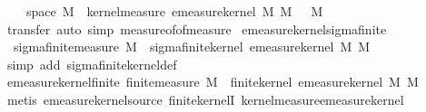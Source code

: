 \begin{isabellebody}
\ \ {\isachardoublequoteopen}{\isasymomega}\ {\isasymin}\ space\ M\ {\isasymLongrightarrow}\ kernel{\isacharunderscore}{\kern0pt}measure\ {\isacharparenleft}{\kern0pt}emeasure{\isacharunderscore}{\kern0pt}kernel\ M\ M{\isacharprime}{\kern0pt}{\isacharparenright}{\kern0pt}\ {\isasymomega}\ {\isacharequal}{\kern0pt}\ M{\isacharprime}{\kern0pt}{\isachardoublequoteclose}\isanewline
%
\isadelimproof
\ \ %
\endisadelimproof
%
\isatagproof
{}\isamarkupfalse%
\ {\isacharparenleft}{\kern0pt}transfer{\isacharcomma}{\kern0pt}\ auto\ simp{\isacharcolon}{\kern0pt}\ measure{\isacharunderscore}{\kern0pt}of{\isacharunderscore}{\kern0pt}of{\isacharunderscore}{\kern0pt}measure{\isacharparenright}{\kern0pt}%
\endisatagproof
{\isafoldproof}%
%
\isadelimproof
\isanewline
%
\endisadelimproof
\isanewline
{}\isamarkupfalse%
\ emeasure{\isacharunderscore}{\kern0pt}kernel{\isacharunderscore}{\kern0pt}sigma{\isacharunderscore}{\kern0pt}finite{\isacharcolon}{\kern0pt}\isanewline
\ \ {\isachardoublequoteopen}sigma{\isacharunderscore}{\kern0pt}finite{\isacharunderscore}{\kern0pt}measure\ M{\isacharprime}{\kern0pt}\ {\isasymLongrightarrow}\ sigma{\isacharunderscore}{\kern0pt}finite{\isacharunderscore}{\kern0pt}kernel\ {\isacharparenleft}{\kern0pt}emeasure{\isacharunderscore}{\kern0pt}kernel\ M\ M{\isacharprime}{\kern0pt}{\isacharparenright}{\kern0pt}{\isachardoublequoteclose}\isanewline
%
\isadelimproof
\ \ %
\endisadelimproof
%
\isatagproof
{}\isamarkupfalse%
\ {\isacharparenleft}{\kern0pt}simp\ add{\isacharcolon}{\kern0pt}\ sigma{\isacharunderscore}{\kern0pt}finite{\isacharunderscore}{\kern0pt}kernel{\isacharunderscore}{\kern0pt}def{\isacharparenright}{\kern0pt}%
\endisatagproof
{\isafoldproof}%
%
\isadelimproof
\isanewline
%
\endisadelimproof
\isanewline
{}\isamarkupfalse%
\ emeasure{\isacharunderscore}{\kern0pt}kernel{\isacharunderscore}{\kern0pt}finite{\isacharcolon}{\kern0pt}\ {\isachardoublequoteopen}finite{\isacharunderscore}{\kern0pt}measure\ M{\isacharprime}{\kern0pt}\ {\isasymLongrightarrow}\ finite{\isacharunderscore}{\kern0pt}kernel\ {\isacharparenleft}{\kern0pt}emeasure{\isacharunderscore}{\kern0pt}kernel\ M\ M{\isacharprime}{\kern0pt}{\isacharparenright}{\kern0pt}{\isachardoublequoteclose}\isanewline
%
\isadelimproof
\ \ %
\endisadelimproof
%
\isatagproof
{}\isamarkupfalse%
\ {\isacharparenleft}{\kern0pt}metis\ emeasure{\isacharunderscore}{\kern0pt}kernel{\isacharunderscore}{\kern0pt}source\ finite{\isacharunderscore}{\kern0pt}kernelI\ kernel{\isacharunderscore}{\kern0pt}measure{\isacharunderscore}{\kern0pt}emeasure{\isacharunderscore}{\kern0pt}kernel{\isacharparenright}{\kern0pt}%

\end{isabellebody}
